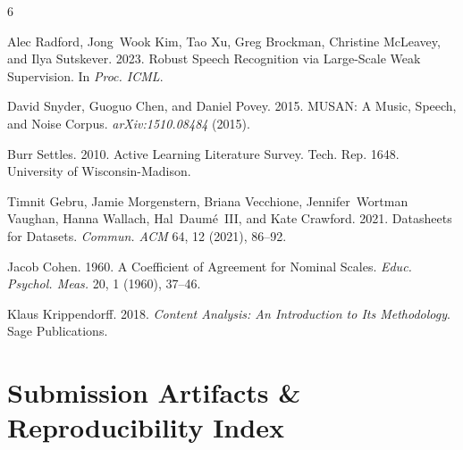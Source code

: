 \documentclass[sigconf,authordraft]{acmart}
\begin{document}

\begin{thebibliography}{6}

Alec Radford, Jong~Wook Kim, Tao Xu, Greg Brockman, Christine McLeavey, and Ilya Sutskever. 2023.
\newblock Robust Speech Recognition via Large-Scale Weak Supervision.
\newblock In \emph{Proc. ICML}.

David Snyder, Guoguo Chen, and Daniel Povey. 2015.
\newblock MUSAN: A Music, Speech, and Noise Corpus.
\newblock \emph{arXiv:1510.08484} (2015).

Burr Settles. 2010.
\newblock Active Learning Literature Survey.
\newblock Tech. Rep. 1648. University of Wisconsin-Madison.

Timnit Gebru, Jamie Morgenstern, Briana Vecchione, Jennifer~Wortman Vaughan, Hanna Wallach, Hal~Daum{\'e}~III, and Kate Crawford. 2021.
\newblock Datasheets for Datasets.
\newblock \emph{Commun. ACM} 64, 12 (2021), 86--92.

Jacob Cohen. 1960.
\newblock A Coefficient of Agreement for Nominal Scales.
\newblock \emph{Educ. Psychol. Meas.} 20, 1 (1960), 37--46.

Klaus Krippendorff. 2018.
\newblock \emph{Content Analysis: An Introduction to Its Methodology}.
\newblock Sage Publications.

\end{thebibliography}

\appendix

\section{Submission Artifacts \& Reproducibility Index}
\label{app:artifacts}
\end{document}
